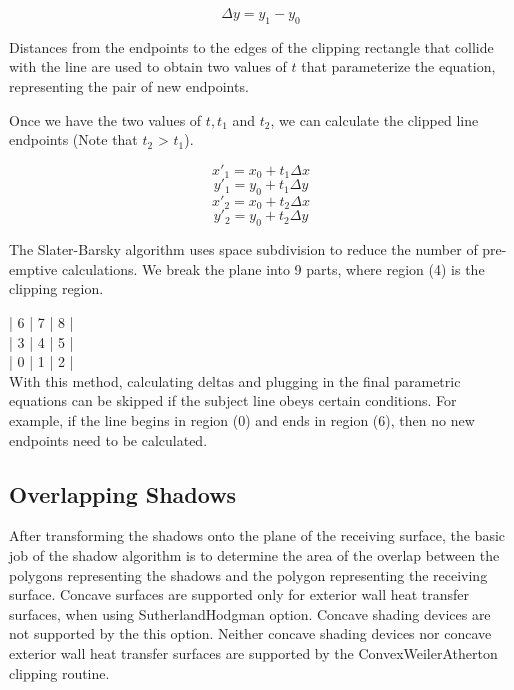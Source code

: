 \begin{equation}
\Delta y = y_1 - y_0
\end{equation}

Distances from the endpoints to the edges of the clipping rectangle that collide with the line are used to obtain two values of $t$ that parameterize the equation, representing the pair of new endpoints.

Once we have the two values of $t, t_1$ and $t_2$, we can calculate the clipped line endpoints (Note that $t_2$ > $t_1$).

\begin{equation}
x'_1 = x_0 + t_1 \Delta x
\end{equation}
\begin{equation}
y'_1 = y_0 + t_1 \Delta y
\end{equation}
\begin{equation}
x'_2 = x_0 + t_2 \Delta x
\end{equation}
\begin{equation}
y'_2 = y_0 + t_2 \Delta y
\end{equation}

The Slater-Barsky algorithm uses space subdivision to reduce the number of pre-emptive calculations. We break the plane into 9 parts, where region (4) is the clipping region.


| 6 | 7 | 8 | \\
| 3 | 4 | 5 | \\
| 0 | 1 | 2 | \\


With this method, calculating deltas and plugging in the final parametric equations can be skipped if the subject line obeys certain conditions. For example, if the line begins in region (0) and ends in region (6), then no new endpoints need to be calculated.

\subsection{Overlapping Shadows}\label{overlapping-shadows}

After transforming the shadows onto the plane of the receiving surface, the basic job of the shadow algorithm is to determine the area of the overlap between the polygons representing the shadows and the polygon representing the receiving surface. Concave surfaces are supported only for exterior wall heat transfer surfaces, when using SutherlandHodgman option. Concave shading devices are not supported by the this option. Neither concave shading devices nor concave exterior wall heat transfer surfaces are supported by the ConvexWeilerAtherton clipping routine.

